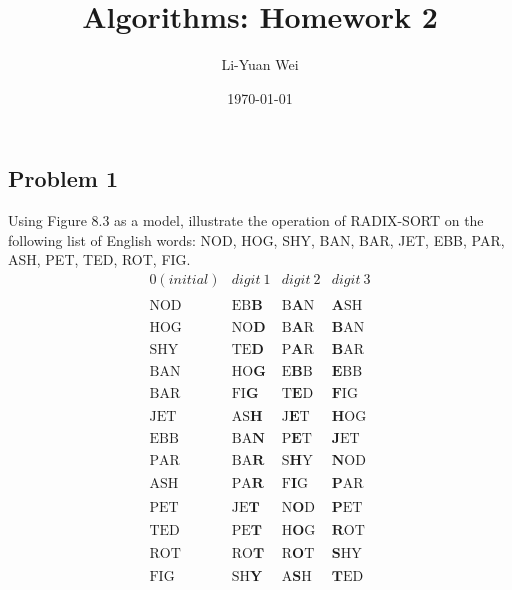 \documentclass[a4paper]{article}
\begin{document}
\title{Algorithms: Homework 2}
\author{Li-Yuan Wei}
\date{\today}
\maketitle

\subsection*{Problem 1}
Using Figure 8.3 as a model, illustrate the operation of RADIX-SORT on the following list of English words: NOD, HOG, SHY, BAN, BAR, JET, EBB, PAR, ASH, PET, TED, ROT, FIG.
$$
\begin{array}{cccc}
0(initial)& digit\ 1 & digit\ 2 & digit\ 3 \\\\
\hline
\text{NOD} & \text{EB$\textbf{B}$} & \text{B$\textbf{A}$N} & \text{$\textbf{A}$SH} \\\\
\text{HOG} & \text{NO$\textbf{D}$} & \text{B$\textbf{A}$R} & \text{$\textbf{B}$AN} \\\\
\text{SHY} & \text{TE$\textbf{D}$} & \text{P$\textbf{A}$R} & \text{$\textbf{B}$AR} \\\\
\text{BAN} & \text{HO$\textbf{G}$} & \text{E$\textbf{B}$B} & \text{$\textbf{E}$BB} \\\\
\text{BAR} & \text{FI$\textbf{G}$} & \text{T$\textbf{E}$D} & \text{$\textbf{F}$IG} \\\\
\text{JET} & \text{AS$\textbf{H}$} & \text{J$\textbf{E}$T} & \text{$\textbf{H}$OG} \\\\
\text{EBB} & \text{BA$\textbf{N}$} & \text{P$\textbf{E}$T} & \text{$\textbf{J}$ET} \\\\
\text{PAR} & \text{BA$\textbf{R}$} & \text{S$\textbf{H}$Y} & \text{$\textbf{N}$OD} \\\\
\text{ASH} & \text{PA$\textbf{R}$} & \text{F$\textbf{I}$G} & \text{$\textbf{P}$AR} \\\\
\text{PET} & \text{JE$\textbf{T}$} & \text{N$\textbf{O}$D} & \text{$\textbf{P}$ET} \\\\
\text{TED} & \text{PE$\textbf{T}$} & \text{H$\textbf{O}$G} & \text{$\textbf{R}$OT} \\\\
\text{ROT} & \text{RO$\textbf{T}$} & \text{R$\textbf{O}$T} & \text{$\textbf{S}$HY} \\\\
\text{FIG} & \text{SH$\textbf{Y}$} & \text{A$\textbf{S}$H} & \text{$\textbf{T}$ED} \\\\
\end{array}
$$
\end{document}
